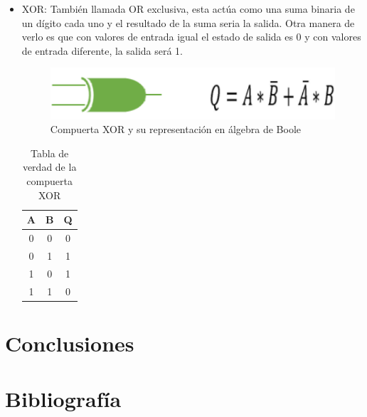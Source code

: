 \documentclass[journal]{IEEEtran}
\begin{document}
\begin{itemize}
		\item XOR: También llamada OR exclusiva, esta actúa como una suma binaria de un dígito cada uno y el resultado de la suma seria la salida. Otra manera de verlo es que con valores de entrada igual el estado de salida es 0 y con valores de entrada diferente, la salida será 1.
		
		\begin{figure}[!htb]
			\centering
			\includegraphics[scale = 0.4]{img/XOR.png}
			\caption{Compuerta XOR y su representación en álgebra de Boole \cite{Tocci2007}}
			\label{fig:XOR}
		\end{figure}
		
		\begin{table}[!htb]
			\centering
			\begin{tabular}{|c|c|c|}
				\hline
				A & B & Q \\
				\hline
				\hline
				0 & 0 & 0 \\
				\hline
				0 & 1 & 1 \\
				\hline
				1 & 0 & 1 \\
				\hline
				1 & 1 & 0 \\
				\hline
			\end{tabular}
			\caption{Tabla de verdad de la compuerta XOR}
			\label{tab:XOR}
		\end{table}
		
	\end{itemize}
	
	\section{Conclusiones}
	
	\section{Bibliografía}
	
	
	
	
\end{document}
